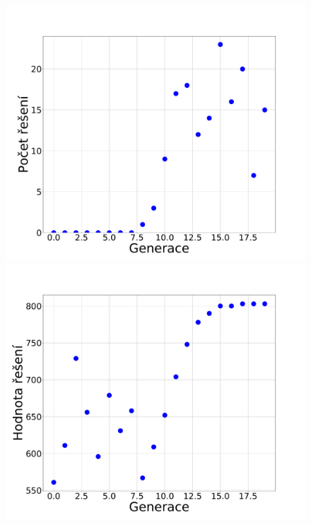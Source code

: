 \documentclass[11pt]{article}
\begin{document}
\begin{figure}
\begin{minipage}[c]{0.325\textwidth}
        \centering \includegraphics[width=\textwidth]{img/gc1s.pdf} 
    \end{minipage}
    \begin{minipage}[c]{0.325\textwidth}
        \centering \includegraphics[width=\textwidth]{img/gc1w.pdf} 
    \end{minipage}
    \\
    \begin{minipage}[c]{0.325\textwidth}

\end{minipage}
\end{figure}
\end{document}
